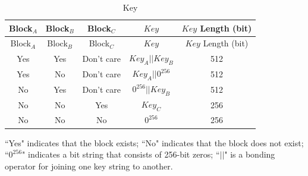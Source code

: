 \documentclass[main\_\_EN.tex]{subfiles}
\begin{document}
\begin{longtable}[c]{ |c|c|c|c|c| }
\caption{Key}
\label{table:ExternalMemoryEncryptionDecryptionKeyPossibility}
\\\hline
\rowcolor{lightgray}
Block$_A$   &   Block$_B$   &   Block$_C$   &   \begin{math}Key\end{math}          &   \begin{math}Key\end{math} Length (bit)
\\\hline
\endfirsthead
\hline
\rowcolor{lightgray}
Block$_A$   &   Block$_B$   &   Block$_C$   &   \begin{math}Key\end{math}    &   \begin{math}Key\end{math} Length (bit)
\\\hline
\endhead
\endfoot
Yes         &   Yes         &  Don't care       &   \begin{math}Key_{A} || Key_{B}\end{math}    &   512 \\\hline
Yes         &   No          &   Don't care     &   \begin{math}Key_{A} || 0^{256}\end{math}    &   512 \\\hline
No          &   Yes         &   Don't care      &   \begin{math}0^{256} || Key_{B}\end{math}    &   512 \\\hline
No          &   No          &   Yes         &   \begin{math}           Key_{C}\end{math}    &   256 \\\hline
No          &   No          &   No          &   \begin{math}           0^{256}\end{math}    &   256 \\\hline
\end{longtable}
\vspace{-1em}
``Yes" indicates that the block exists; ``No" indicates that the block does not exist; ``\begin{math}0^{256}\end{math}" indicates a bit string that consists of 256-bit zeros; ``\begin{math}||\end{math}" is a bonding operator for joining one key string to another.
\end{document}
